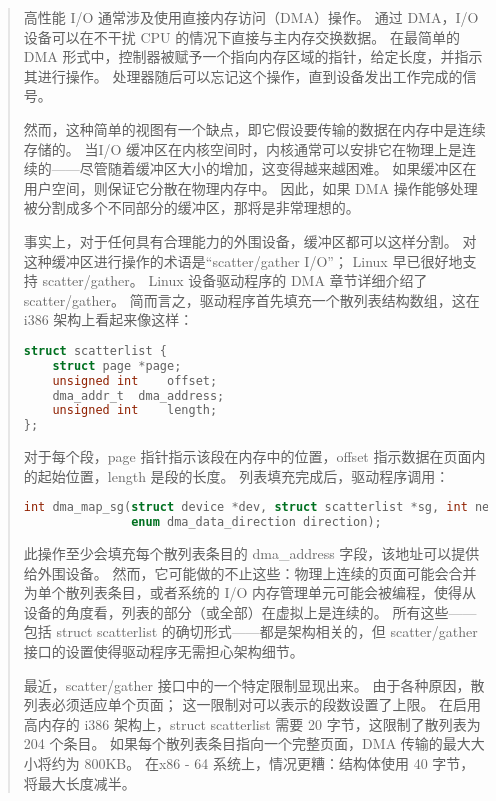 \begin{quote}

高性能 I/O 通常涉及使用直接内存访问（DMA）操作。
通过 DMA，I/O 设备可以在不干扰 CPU 的情况下直接与主内存交换数据。
在最简单的 DMA 形式中，控制器被赋予一个指向内存区域的指针，给定长度，并指示其进行操作。
处理器随后可以忘记这个操作，直到设备发出工作完成的信号。

然而，这种简单的视图有一个缺点，即它假设要传输的数据在内存中是连续存储的。
当I/O 缓冲区在内核空间时，内核通常可以安排它在物理上是连续的——尽管随着缓冲区大小的增加，这变得越来越困难。
如果缓冲区在用户空间，则保证它分散在物理内存中。
因此，如果 DMA 操作能够处理被分割成多个不同部分的缓冲区，那将是非常理想的。

事实上，对于任何具有合理能力的外围设备，缓冲区都可以这样分割。
对这种缓冲区进行操作的术语是“scatter/gather I/O”；
Linux 早已很好地支持 scatter/gather。
Linux 设备驱动程序的 DMA 章节详细介绍了 scatter/gather。
简而言之，驱动程序首先填充一个散列表结构数组，这在 i386 架构上看起来像这样：

\begin{lstlisting}[language=C]
struct scatterlist {
    struct page *page;
    unsigned int    offset;
    dma_addr_t  dma_address;
    unsigned int    length;
};
\end{lstlisting}

对于每个段，page 指针指示该段在内存中的位置，offset 指示数据在页面内的起始位置，length 是段的长度。
列表填充完成后，驱动程序调用：

\begin{lstlisting}[language=C]
int dma_map_sg(struct device *dev, struct scatterlist *sg, int nents,
               enum dma_data_direction direction);
\end{lstlisting}

此操作至少会填充每个散列表条目的 dma\_address 字段，该地址可以提供给外围设备。
然而，它可能做的不止这些：物理上连续的页面可能会合并为单个散列表条目，或者系统的 I/O 内存管理单元可能会被编程，使得从设备的角度看，列表的部分（或全部）在虚拟上是连续的。
所有这些——包括 struct scatterlist 的确切形式——都是架构相关的，但 scatter/gather 接口的设置使得驱动程序无需担心架构细节。

最近，scatter/gather 接口中的一个特定限制显现出来。
由于各种原因，散列表必须适应单个页面；
这一限制对可以表示的段数设置了上限。
在启用高内存的 i386 架构上，struct scatterlist 需要 20 字节，这限制了散列表为 204 个条目。
如果每个散列表条目指向一个完整页面，DMA 传输的最大大小将约为 800KB。
在x86 - 64 系统上，情况更糟：结构体使用 40 字节，将最大长度减半。


\end{quote}
